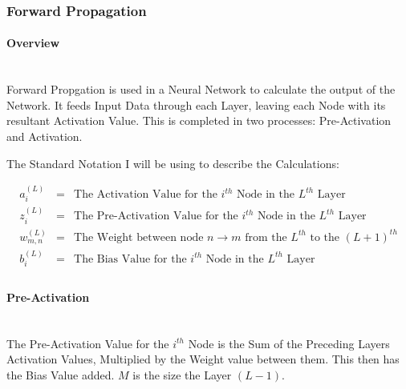 \begin{flushleft}
            \subsubsection{Forward Propagation}
                \paragraph{Overview} \mbox{} \\
                    \vspace{0.2cm}
                    Forward Propgation is used in a Neural Network to calculate the output of the Network. It feeds Input Data through each
                    Layer, leaving each Node with its resultant Activation Value. This is completed in two processes: Pre-Activation and Activation. \\
                    \vspace{0.4cm}
                    \centerline{The Standard Notation I will be using to describe the Calculations:}

                    \begin{addmargin}[2em]{0em}        
                        \begin{eqnarray*}
                            a^{(L)}_{i} &=&  \text{The Activation Value for the $i^{th}$ Node in the $L^{th}$ Layer} \\
                            z^{(L)}_{i} &=&  \text{The Pre-Activation Value for the $i^{th}$ Node in the $L^{th}$ Layer} \\
                            w^{(L)}_{m,n} &=&  \text{The Weight between node $n \rightarrow m$ from the $L^{th}$ to the $(L + 1)^{th}$} \\
                            b^{(L)}_{i} &=& \text{The Bias Value for the $i^{th}$ Node in the $L^{th}$ Layer} \\
                        \end{eqnarray*}             
                    \end{addmargin}
                    \vspace{0.4cm}

                \paragraph{Pre-Activation} \mbox{} \\
                    \vspace{0.2cm}
                    The Pre-Activation Value for the $i^{th}$ Node is the Sum of the Preceding Layers Activation Values, Multiplied by the Weight value
                    between them. This then has the Bias Value added. $M$ is the size the Layer $(L - 1)$.


\end{flushleft}
